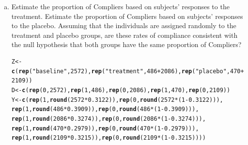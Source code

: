\documentclass[11pt,notitlepage]{article}\usepackage[]{graphicx}\usepackage[]{color}
\makeatletter
\newcommand{\hlnum}[1]{\textcolor[rgb]{0.686,0.059,0.569}{#1}}%
\newcommand{\hlstr}[1]{\textcolor[rgb]{0.192,0.494,0.8}{#1}}%
\newcommand{\hlopt}[1]{\textcolor[rgb]{0,0,0}{#1}}%
\newcommand{\hlstd}[1]{\textcolor[rgb]{0.345,0.345,0.345}{#1}}%
\newcommand{\hlkwb}[1]{\textcolor[rgb]{0.69,0.353,0.396}{#1}}%
\newcommand{\hlkwd}[1]{\textcolor[rgb]{0.737,0.353,0.396}{\textbf{#1}}}%
\newenvironment{kframe}{%
 \def\at@end@of@kframe{}%
 \ifinner\ifhmode%
  \def\at@end@of@kframe{\end{minipage}}%
  \begin{minipage}{\columnwidth}%
 \fi\fi%
 \def\FrameCommand##1{\hskip\@totalleftmargin \hskip-\fboxsep
 \colorbox{shadecolor}{##1}\hskip-\fboxsep
     \hskip-\linewidth \hskip-\@totalleftmargin \hskip\columnwidth}%
 \MakeFramed {\advance\hsize-\width
   \@totalleftmargin\z@ \linewidth\hsize
   \@setminipage}}%
 {\par\unskip\endMakeFramed%
 \at@end@of@kframe}
\newenvironment{knitrout}{}{} %
\makeatother
\begin{document}
\begin{enumerate}[a)]
\item Estimate the proportion of Compliers based on subjects' responses to the treatment.
Estimate the proportion of Compliers based on subjects' responses to the placebo. Assuming that the individuals are assigned randomly to the treatment and placebo groups, are these rates of compliance consistent with the null hypothesis that both groups have the same proportion of Compliers? \\

\begin{knitrout}
\color{fgcolor}\begin{kframe}
\begin{alltt}
\hlstd{Z} \hlkwb{<-} \hlkwd{c}\hlstd{(}\hlkwd{rep}\hlstd{(}\hlstr{"baseline"}\hlstd{,} \hlnum{2572}\hlstd{),} \hlkwd{rep}\hlstd{(}\hlstr{"treatment"}\hlstd{,} \hlnum{486}\hlopt{+}\hlnum{2086}\hlstd{),} \hlkwd{rep}\hlstd{(}\hlstr{"placebo"}\hlstd{,} \hlnum{470}\hlopt{+}\hlnum{2109}\hlstd{))}
\hlstd{D} \hlkwb{<-} \hlkwd{c}\hlstd{(}\hlkwd{rep}\hlstd{(}\hlnum{0}\hlstd{,} \hlnum{2572}\hlstd{),} \hlkwd{rep}\hlstd{(}\hlnum{1}\hlstd{,} \hlnum{486}\hlstd{),} \hlkwd{rep}\hlstd{(}\hlnum{0}\hlstd{,}\hlnum{2086}\hlstd{),} \hlkwd{rep}\hlstd{(}\hlnum{1}\hlstd{,} \hlnum{470}\hlstd{),} \hlkwd{rep}\hlstd{(}\hlnum{0}\hlstd{,}\hlnum{2109}\hlstd{))}
\hlstd{Y} \hlkwb{<-} \hlkwd{c}\hlstd{(}\hlkwd{rep}\hlstd{(}\hlnum{1}\hlstd{,} \hlkwd{round}\hlstd{(}\hlnum{2572}\hlopt{*}\hlnum{0.3122}\hlstd{)),} \hlkwd{rep}\hlstd{(}\hlnum{0}\hlstd{,}\hlkwd{round}\hlstd{(}\hlnum{2572}\hlopt{*}\hlstd{(}\hlnum{1}\hlopt{-}\hlnum{0.3122}\hlstd{))),}
       \hlkwd{rep}\hlstd{(}\hlnum{1}\hlstd{,} \hlkwd{round}\hlstd{(}\hlnum{486}\hlopt{*}\hlnum{0.3909}\hlstd{)),} \hlkwd{rep}\hlstd{(}\hlnum{0}\hlstd{,}\hlkwd{round}\hlstd{(}\hlnum{486}\hlopt{*}\hlstd{(}\hlnum{1}\hlopt{-}\hlnum{0.3909}\hlstd{))),}
       \hlkwd{rep}\hlstd{(}\hlnum{1}\hlstd{,} \hlkwd{round}\hlstd{(}\hlnum{2086}\hlopt{*}\hlnum{0.3274}\hlstd{)),} \hlkwd{rep}\hlstd{(}\hlnum{0}\hlstd{,}\hlkwd{round}\hlstd{(}\hlnum{2086}\hlopt{*}\hlstd{(}\hlnum{1}\hlopt{-}\hlnum{0.3274}\hlstd{))),}
       \hlkwd{rep}\hlstd{(}\hlnum{1}\hlstd{,} \hlkwd{round}\hlstd{(}\hlnum{470}\hlopt{*}\hlnum{0.2979}\hlstd{)),} \hlkwd{rep}\hlstd{(}\hlnum{0}\hlstd{,}\hlkwd{round}\hlstd{(}\hlnum{470}\hlopt{*}\hlstd{(}\hlnum{1}\hlopt{-}\hlnum{0.2979}\hlstd{))),}
       \hlkwd{rep}\hlstd{(}\hlnum{1}\hlstd{,} \hlkwd{round}\hlstd{(}\hlnum{2109}\hlopt{*}\hlnum{0.3215}\hlstd{)),} \hlkwd{rep}\hlstd{(}\hlnum{0}\hlstd{,}\hlkwd{round}\hlstd{(}\hlnum{2109}\hlopt{*}\hlstd{(}\hlnum{1}\hlopt{-}\hlnum{0.3215}\hlstd{))))}

\end{alltt}
\end{kframe}
\end{knitrout}
\end{enumerate}
\end{document}
